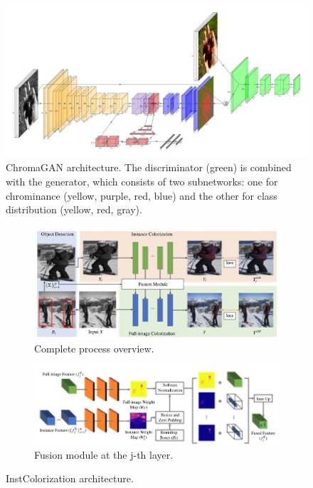 \documentclass[10pt,twocolumn,letterpaper]{article}
\begin{document}
\begin{figure}[htbp]
	\centering
	\includegraphics[width=15cm]{diagram chr.jpg}
	\caption{ChromaGAN architecture. The discriminator (green) is combined with the generator, which consists of two subnetworks: one for chrominance (yellow, purple, red, blue) and the other for class distribution (yellow, red, gray).}
	\label{fig:chr}
\end{figure}

\begin{figure}[t]
	\centering
	
	\begin{subfigure}[b]{0.5\textwidth}
		\centering
		\begin{adjustwidth}{-3cm}{}
		\includegraphics[width=15cm]{diagram su1}
		\end{adjustwidth}
		\caption{Complete process overview.}
		\label{fig:su1}
	\end{subfigure}
	
	\begin{subfigure}[b]{0.5\textwidth}
		\centering
		\begin{adjustwidth}{-3cm}{}
			\includegraphics[width=15cm]{diagram su2}
		\end{adjustwidth}
		\caption{Fusion module at the j-th layer.}
		\label{fig:su2}
	\end{subfigure}

	\caption{{\small InstColorization architecture.}}
\label{fig:su}
\end{figure}
\end{document}
